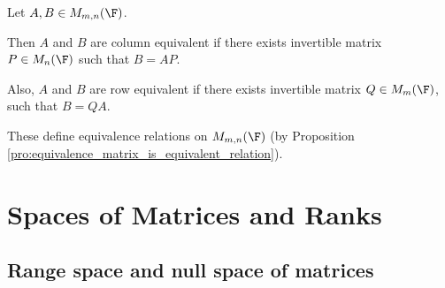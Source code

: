 \begin{definition}
Let $A,B \in M_{m,n}(\F)$.

Then $A$ and $B$ are column equivalent if there exists invertible matrix $P \in M_{n}(\F)$ such that $B =AP$.

Also, $A$ and $B$ are row equivalent if there exists invertible matrix $Q \in M_{m}(\F)$, such that $B = QA$.
\end{definition}

\begin{remark}
These define equivalence relations on $M_{m,n}(\F)$ (by Proposition \ref{pro:equivalence_matrix_is_equivalent_relation}).
\end{remark}



\section{Spaces of Matrices and Ranks}

\subsection{Range space and null space of matrices}

